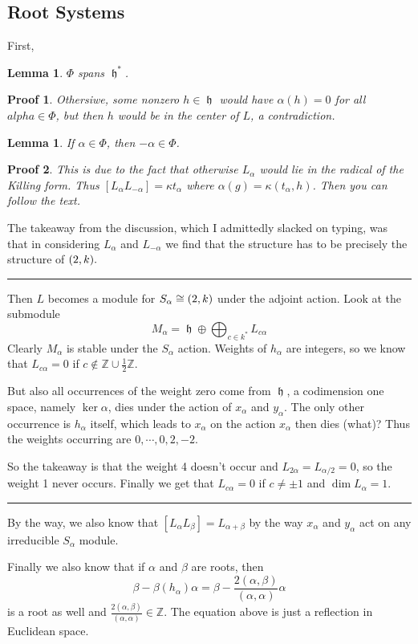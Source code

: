 \documentclass[12pt]{article}
\theoremstyle{nonumberbreak}
\theoremstyle{changebreak}
\newtheorem{lem}[thm]{Lemma}
\theoremstyle{nonumberbreak}
\newtheorem{prf}{Proof}
\theoremstyle{change}
\newcommand*{\Z}{
\mathbb{Z}
}
\newcommand*{\brk}{
\rule{2in}{.1pt}
}
\let\sl\relax
\DeclareMathOperator{\sl}{\mathfrak{sl}}
\DeclareMathOperator{\h}{\mathfrak{h}}
\begin{document}
\subsection{Root Systems}
First,
\begin{lem}
	$\Phi$ spans $\h^*$.
\end{lem}
\begin{prf}
	Othersiwe, some nonzero $h\in \h$ would have $\alpha(h)=0$ for all $alpha\in\Phi$, but then $h$ would be in the center of $L$, a contradiction.
\end{prf}
\begin{lem}
	If $\alpha\in \Phi$, then $-\alpha\in\Phi$.
\end{lem}
\begin{prf}
	This is due to the fact that otherwise $L_\alpha$ would lie in the radical of the Killing form. Thus
	$[L_\alpha L_{-\alpha}]=\kappa t_\alpha$ where $\alpha(g)=\kappa(t_\alpha,h)$. Then you can follow the text.
\end{prf}
The takeaway from the discussion, which I admittedly slacked on typing, was that in considering $L_\alpha$ and $L_{-\alpha}$ we find that the structure
has to be precisely the structure of $\sl(2,k).$ 

\brk

Then $L$ becomes a module for $S_\alpha\cong\sl(2,k)$ under the adjoint action. Look at the submodule
\[M_\alpha=\h\oplus\bigoplus_{c\in k^*}L_{c\alpha}\]
Clearly $M_\alpha$ is stable under the $S_\alpha$ action. Weights of $h_\alpha$ are integers, so we know that 
$L_{c\alpha}=0$ if $c\notin\Z\cup\frac{1}{2}\Z$.

But also all occurrences of the weight zero come from $\h$, a codimension one space, namely $\ker\alpha$, dies under the action of $x_\alpha$ and $y_\alpha$.
The only other occurrence is $h_\alpha$ itself, which leads to $x_\alpha$ on the action $x_\alpha$ then dies (what)? Thus the weights occurring are $0,\cdots,0,2,-2$.

So the takeaway is that the weight 4 doesn't occur and $L_{2\alpha}=L_{\alpha/2}=0$, so the weight 1 never occurs.
Finally we get that $L_{c\alpha}=0$ if $c\ne \pm 1$ and $\dim L_{\alpha}=1$.

\brk

By the way, we also know that $[L_\alpha L_\beta]=L_{\alpha+\beta}$ by the way $x_\alpha$ and $y_\alpha$ act on any irreducible $S_\alpha$ module.

Finally we also know that if $\alpha$ and $\beta$ are roots, then 
\[\beta-\beta(h_\alpha)\alpha=\beta-\frac{2(\alpha,\beta)}{(\alpha,\alpha)}\alpha\]
is a root as well and $\frac{2(\alpha,\beta)}{(\alpha,\alpha)}\in\Z$. The equation above is just a reflection in Euclidean space.
\end{document}
